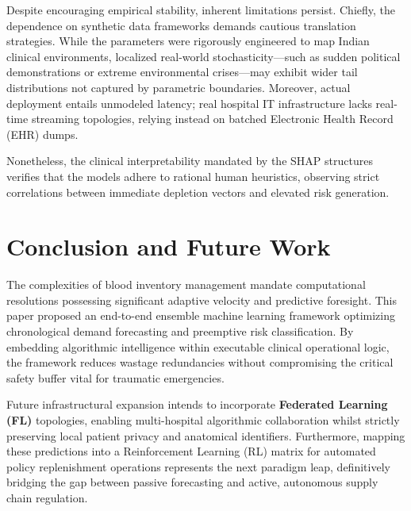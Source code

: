 \documentclass[conference]{IEEEtran}
\begin{document}
Despite encouraging empirical stability, inherent limitations persist. Chiefly, the dependence on synthetic data frameworks demands cautious translation strategies. While the parameters were rigorously engineered to map Indian clinical environments, localized real-world stochasticity—such as sudden political demonstrations or extreme environmental crises—may exhibit wider tail distributions not captured by parametric boundaries. Moreover, actual deployment entails unmodeled latency; real hospital IT infrastructure lacks real-time streaming topologies, relying instead on batched Electronic Health Record (EHR) dumps.

Nonetheless, the clinical interpretability mandated by the SHAP structures verifies that the models adhere to rational human heuristics, observing strict correlations between immediate depletion vectors and elevated risk generation.

\section{Conclusion and Future Work}
The complexities of blood inventory management mandate computational resolutions possessing significant adaptive velocity and predictive foresight. This paper proposed an end-to-end ensemble machine learning framework optimizing chronological demand forecasting and preemptive risk classification. By embedding algorithmic intelligence within executable clinical operational logic, the framework reduces wastage redundancies without compromising the critical safety buffer vital for traumatic emergencies. 

Future infrastructural expansion intends to incorporate \textbf{Federated Learning (FL)} topologies, enabling multi-hospital algorithmic collaboration whilst strictly preserving local patient privacy and anatomical identifiers. Furthermore, mapping these predictions into a Reinforcement Learning (RL) matrix for automated policy replenishment operations represents the next paradigm leap, definitively bridging the gap between passive forecasting and active, autonomous supply chain regulation.
\end{document}
